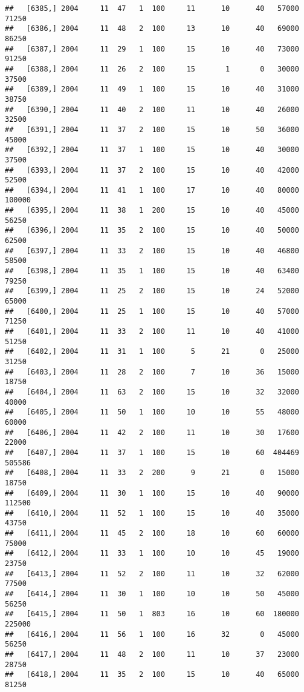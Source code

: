 \documentclass{article}\usepackage[]{graphicx}\usepackage[]{color}
\makeatletter
\newenvironment{kframe}{%
 \def\at@end@of@kframe{}%
 \ifinner\ifhmode%
  \def\at@end@of@kframe{\end{minipage}}%
  \begin{minipage}{\columnwidth}%
 \fi\fi%
 \def\FrameCommand##1{\hskip\@totalleftmargin \hskip-\fboxsep
 \colorbox{shadecolor}{##1}\hskip-\fboxsep
     \hskip-\linewidth \hskip-\@totalleftmargin \hskip\columnwidth}%
 \MakeFramed {\advance\hsize-\width
   \@totalleftmargin\z@ \linewidth\hsize
   \@setminipage}}%
 {\par\unskip\endMakeFramed%
 \at@end@of@kframe}
\newenvironment{knitrout}{}{} %
\makeatother
\begin{document}
\begin{knitrout}
\begin{kframe}
\begin{verbatim}
##   [6385,] 2004     11  47   1  100     11      10      40   57000   71250
##   [6386,] 2004     11  48   2  100     13      10      40   69000   86250
##   [6387,] 2004     11  29   1  100     15      10      40   73000   91250
##   [6388,] 2004     11  26   2  100     15       1       0   30000   37500
##   [6389,] 2004     11  49   1  100     15      10      40   31000   38750
##   [6390,] 2004     11  40   2  100     11      10      40   26000   32500
##   [6391,] 2004     11  37   2  100     15      10      50   36000   45000
##   [6392,] 2004     11  37   1  100     15      10      40   30000   37500
##   [6393,] 2004     11  37   2  100     15      10      40   42000   52500
##   [6394,] 2004     11  41   1  100     17      10      40   80000  100000
##   [6395,] 2004     11  38   1  200     15      10      40   45000   56250
##   [6396,] 2004     11  35   2  100     15      10      40   50000   62500
##   [6397,] 2004     11  33   2  100     15      10      40   46800   58500
##   [6398,] 2004     11  35   1  100     15      10      40   63400   79250
##   [6399,] 2004     11  25   2  100     15      10      24   52000   65000
##   [6400,] 2004     11  25   1  100     15      10      40   57000   71250
##   [6401,] 2004     11  33   2  100     11      10      40   41000   51250
##   [6402,] 2004     11  31   1  100      5      21       0   25000   31250
##   [6403,] 2004     11  28   2  100      7      10      36   15000   18750
##   [6404,] 2004     11  63   2  100     15      10      32   32000   40000
##   [6405,] 2004     11  50   1  100     10      10      55   48000   60000
##   [6406,] 2004     11  42   2  100     11      10      30   17600   22000
##   [6407,] 2004     11  37   1  100     15      10      60  404469  505586
##   [6408,] 2004     11  33   2  200      9      21       0   15000   18750
##   [6409,] 2004     11  30   1  100     15      10      40   90000  112500
##   [6410,] 2004     11  52   1  100     15      10      40   35000   43750
##   [6411,] 2004     11  45   2  100     18      10      60   60000   75000
##   [6412,] 2004     11  33   1  100     10      10      45   19000   23750
##   [6413,] 2004     11  52   2  100     11      10      32   62000   77500
##   [6414,] 2004     11  30   1  100     10      10      50   45000   56250
##   [6415,] 2004     11  50   1  803     16      10      60  180000  225000
##   [6416,] 2004     11  56   1  100     16      32       0   45000   56250
##   [6417,] 2004     11  48   2  100     11      10      37   23000   28750
##   [6418,] 2004     11  35   2  100     15      10      40   65000   81250

\end{verbatim}
\end{kframe}
\end{knitrout}
\end{document}
